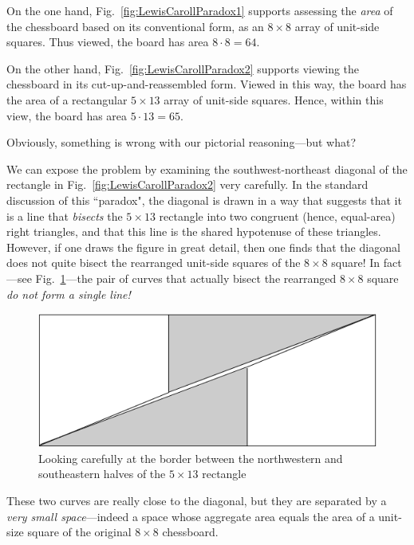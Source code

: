 On the one hand, Fig.~\ref{fig:LewisCarollParadox1} supports assessing the {\em area} of the chessboard based on its conventional form, as an $8 \times 8$ array of unit-side squares.  Thus viewed, the board has area $8 \cdot 8 = 64$.

\smallskip

On the other hand, Fig.~\ref{fig:LewisCarollParadox2} supports viewing the chessboard in its cut-up-and-reassembled form.  Viewed in this way, the board has the area of a rectangular $5 \times 13$ array of unit-side squares.  Hence, within this view, the board has area $5 \cdot 13 = 65$.

\medskip

Obviously, something is wrong with our pictorial reasoning---but what?

\medskip

We can expose the problem by examining the southwest-northeast diagonal of the rectangle in Fig.~\ref{fig:LewisCarollParadox2} very carefully.  In the standard discussion of this ``paradox", the diagonal is drawn in a way that suggests that it is a line that {\em bisects} the $5 \times 13$ rectangle into two congruent (hence, equal-area) right triangles, and that this line is the shared hypotenuse of these triangles.  However, if one draws the figure in great detail, then one finds that the diagonal does not quite bisect the rearranged unit-side squares of the $8 \times 8$ square!  In fact---see Fig.~\ref{fig:LewisCarollParadoxSol}---the pair of curves that actually bisect the rearranged $8 \times 8$ square {\em do not form a single line!}
\begin{figure}[ht]
\begin{center}
       \includegraphics[scale=0.5]{FiguresMaths/LewisCarollParadoxSolution}
\caption{Looking carefully at the border between the northwestern and southeastern halves of the $5 \times 13$ rectangle}
       \label{fig:LewisCarollParadoxSol}
\end{center}
\end{figure}
These two curves are really close to the diagonal, but they are separated by a {\em very small space}---indeed a space whose aggregate area equals the area of a unit-size square of the original $8 \times 8$ chessboard.

